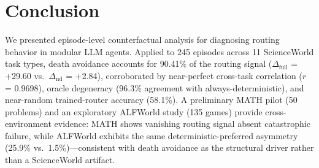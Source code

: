 \section{Conclusion}

We presented episode-level counterfactual analysis for diagnosing routing behavior in modular LLM agents. Applied to 245 episodes across 11 ScienceWorld task types, death avoidance accounts for 90.41\% of the routing signal ($\Delta_{\text{full}}$ = +29.60 vs.\ $\Delta_{\text{nd}}$ = +2.84), corroborated by near-perfect cross-task correlation ($r$ = 0.9698), oracle degeneracy (96.3\% agreement with always-deterministic), and near-random trained-router accuracy (58.1\%). A preliminary MATH pilot (50 problems) and an exploratory ALFWorld study (135 games) provide cross-environment evidence: MATH shows vanishing routing signal absent catastrophic failure, while ALFWorld exhibits the same deterministic-preferred asymmetry (25.9\% vs.\ 1.5\%)---consistent with death avoidance as the structural driver rather than a ScienceWorld artifact.
